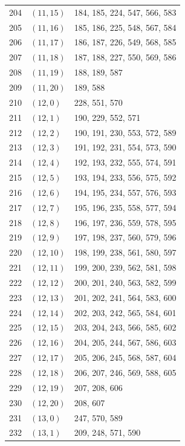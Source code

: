 \documentclass{article}
\begin{document}
\begin{longtable}{lll}
  204 & \((11, 15)\) & 184, 185, 224, 547, 566, 583 \\
  205 & \((11, 16)\) & 185, 186, 225, 548, 567, 584 \\
  206 & \((11, 17)\) & 186, 187, 226, 549, 568, 585 \\
  207 & \((11, 18)\) & 187, 188, 227, 550, 569, 586 \\
  208 & \((11, 19)\) & 188, 189, 587 \\
  209 & \((11, 20)\) & 189, 588 \\
  210 & \((12, 0)\) & 228, 551, 570 \\
  211 & \((12, 1)\) & 190, 229, 552, 571 \\
  212 & \((12, 2)\) & 190, 191, 230, 553, 572, 589 \\
  213 & \((12, 3)\) & 191, 192, 231, 554, 573, 590 \\
  214 & \((12, 4)\) & 192, 193, 232, 555, 574, 591 \\
  215 & \((12, 5)\) & 193, 194, 233, 556, 575, 592 \\
  216 & \((12, 6)\) & 194, 195, 234, 557, 576, 593 \\
  217 & \((12, 7)\) & 195, 196, 235, 558, 577, 594 \\
  218 & \((12, 8)\) & 196, 197, 236, 559, 578, 595 \\
  219 & \((12, 9)\) & 197, 198, 237, 560, 579, 596 \\
  220 & \((12, 10)\) & 198, 199, 238, 561, 580, 597 \\
  221 & \((12, 11)\) & 199, 200, 239, 562, 581, 598 \\
  222 & \((12, 12)\) & 200, 201, 240, 563, 582, 599 \\
  223 & \((12, 13)\) & 201, 202, 241, 564, 583, 600 \\
  224 & \((12, 14)\) & 202, 203, 242, 565, 584, 601 \\
  225 & \((12, 15)\) & 203, 204, 243, 566, 585, 602 \\
  226 & \((12, 16)\) & 204, 205, 244, 567, 586, 603 \\
  227 & \((12, 17)\) & 205, 206, 245, 568, 587, 604 \\
  228 & \((12, 18)\) & 206, 207, 246, 569, 588, 605 \\
  229 & \((12, 19)\) & 207, 208, 606 \\
  230 & \((12, 20)\) & 208, 607 \\
  231 & \((13, 0)\) & 247, 570, 589 \\
  232 & \((13, 1)\) & 209, 248, 571, 590 \\

\end{longtable}
\end{document}
